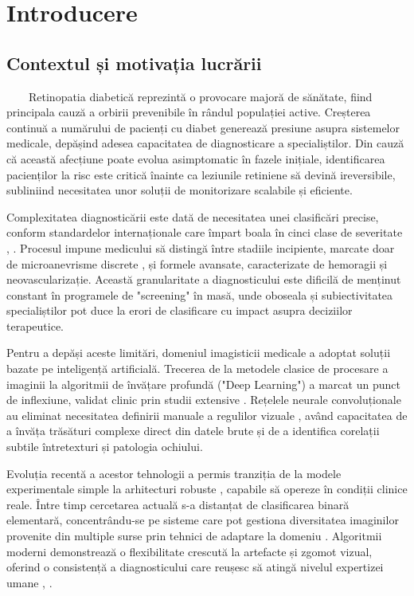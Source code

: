 \documentclass[12pt, a4paper, twoside, romanian]{teza-upb}
\newcommand\blankpage{%
    \null
    \thispagestyle{empty}%
    \addtocounter{page}{-1}
    \newpage}
\begin{document}
\afterpage{\blankpage}

\chapter{Introducere}

\section*{Contextul și motivația lucrării}

\ \ \ \ Retinopatia diabetică reprezintă o provocare majoră de sănătate, fiind principala cauză
a orbirii prevenibile în rândul populației active. Creșterea continuă a numărului de pacienți cu diabet
generează presiune asupra sistemelor medicale, depășind adesea capacitatea de diagnosticare a
specialiștilor. Din cauză că această afecțiune poate evolua asimptomatic în fazele inițiale, identificarea pacienților
la risc este critică înainte ca leziunile retiniene să devină ireversibile, subliniind necesitatea unor soluții
de monitorizare scalabile și eficiente.
\bigskip

Complexitatea diagnosticării este dată de necesitatea unei clasificări precise, conform
standardelor internaționale care împart boala în cinci clase de severitate \cite{6_wang2021deep}, \cite{11_shakibania2024dual}. Procesul impune
medicului să distingă între stadiile incipiente, marcate doar de microanevrisme discrete \cite{13_staal2004ridge}, și formele
avansate, caracterizate de hemoragii și neovascularizație. Această granularitate a diagnosticului este
dificilă de menținut constant în programele de "screening" în masă, unde oboseala și subiectivitatea
specialiștilor pot duce la erori de clasificare cu impact asupra deciziilor terapeutice.
\bigskip

Pentru a depăși aceste limitări, domeniul imagisticii medicale a adoptat soluții bazate pe
inteligență artificială. Trecerea de la metodele clasice de procesare a imaginii \cite{2_sopharak2009automatic} la algoritmii de învățare
profundă ("Deep Learning") a marcat un punct de inflexiune, validat clinic prin studii extensive \cite{3_gulshan2016development}. Rețelele
neurale convoluționale au eliminat necesitatea definirii manuale a regulilor vizuale \cite{4_pratt2016convolutional}, având capacitatea
de a învăța trăsături complexe direct din datele brute \cite{9_chetoui2020explainable} și
de a identifica corelații subtile întretexturi și patologia ochiului.
\bigskip

Evoluția recentă a acestor tehnologii a permis tranziția de la modele experimentale simple la
arhitecturi robuste \cite{7_huang2022rtnet}, capabile să opereze în condiții clinice reale. Între timp cercetarea actuală s-a distanțat de
clasificarea binară elementară, concentrându-se pe sisteme care pot gestiona diversitatea imaginilor
provenite din multiple surse prin tehnici de adaptare la domeniu \cite{8_zhang2022multi}. Algoritmii moderni demonstrează o
flexibilitate crescută la artefacte și zgomot vizual, oferind o consistență a diagnosticului care reușesc să atingă nivelul
expertizei umane \cite{9_chetoui2020explainable}, \cite{10_jabbar2022transfer}.
\end{document}
